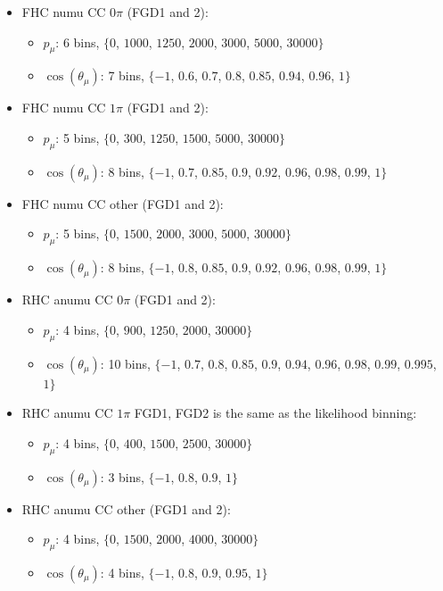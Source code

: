 \begin{itemize}
\item \Gls{FHC} \Gls{numu} \Gls{CC} $0\pi$ (\Gls{FGD}1 and 2):
  \begin{itemize}
  \item $p_\mu$: 6 bins, $\{0$, $1000$, $1250$, $2000$, $3000$, $5000$, $30000\}$
  \item $\cos(\theta_\mu)$: 7 bins, $\{-1$, $0.6$, $0.7$, $0.8$, $0.85$, $0.94$, $0.96$, $1\}$
  \end{itemize}
\item \Gls{FHC} \Gls{numu} \Gls{CC} $1\pi$ (\Gls{FGD}1 and 2):
  \begin{itemize}
  \item $p_\mu$: 5 bins, $\{0$, $300$, $1250$, $1500$, $5000$, $30000\}$
  \item $\cos(\theta_\mu)$: 8 bins, $\{-1$, $0.7$, $0.85$, $0.9$, $0.92$, $0.96$, $0.98$, $0.99$, $1\}$
  \end{itemize} 
\item \Gls{FHC} \Gls{numu} \Gls{CC} other (\Gls{FGD}1 and 2):
  \begin{itemize}
  \item $p_\mu$: 5 bins, $\{0$, $1500$, $2000$, $3000$, $5000$, $30000\}$
  \item $\cos(\theta_\mu)$: 8 bins, $\{-1$, $0.8$, $0.85$, $0.9$, $0.92$, $0.96$, $0.98$, $0.99$, $1\}$
  \end{itemize}  

\item \Gls{RHC} \Gls{anumu} \Gls{CC} $0\pi$ (\Gls{FGD}1 and 2):
  \begin{itemize}
  \item $p_\mu$: 4 bins, $\{0$, $900$, $1250$, $2000$, $30000\}$
  \item $\cos(\theta_\mu)$: 10 bins, $\{-1$, $0.7$, $0.8$, $0.85$, $0.9$, $0.94$, $0.96$, $0.98$, $0.99$, $0.995$, $1\}$
  \end{itemize}
\item \Gls{RHC} \Gls{anumu} \Gls{CC} $1\pi$ \Gls{FGD}1, \Gls{FGD}2 is
  the same as the likelihood binning:
  \begin{itemize}
  \item $p_\mu$: 4 bins, $\{0$, $400$, $1500$, $2500$, $30000\}$
  \item $\cos(\theta_\mu)$: 3 bins, $\{-1$, $0.8$, $0.9$, $1\}$
  \end{itemize} 
\item \Gls{RHC} \Gls{anumu} \Gls{CC} other (\Gls{FGD}1 and 2):
  \begin{itemize}
  \item $p_\mu$: 4 bins, $\{0$, $1500$, $2000$, $4000$, $30000\}$
  \item $\cos(\theta_\mu)$: 4 bins, $\{-1$, $0.8$, $0.9$, $0.95$, $1\}$
  \end{itemize}



\end{itemize}
